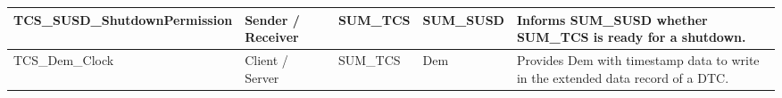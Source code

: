 \begin{longtable}{|l|l|l|l|l|}
\begin{minipage}{0.32\linewidth}\raggedright\vspace{.75ex}TCS\_SUSD\_ShutdownPermission\vspace{.75ex}\end{minipage} & \begin{minipage}{0.11\linewidth}\raggedright\vspace{.75ex}Sender / Receiver\vspace{.75ex}\end{minipage} & \begin{minipage}{0.11\linewidth}\raggedright\vspace{.75ex}SUM\_TCS\vspace{.75ex}\end{minipage} & \begin{minipage}{0.11\linewidth}\raggedright\vspace{.75ex}SUM\_SUSD\vspace{.75ex}\end{minipage} & \begin{minipage}{0.21\linewidth}\raggedright\vspace{.75ex}Informs SUM\_SUSD whether SUM\_TCS is ready for a shutdown.\vspace{.75ex}\end{minipage}\\\hline
\begin{minipage}{0.32\linewidth}\raggedright\vspace{.75ex}TCS\_Dem\_Clock\vspace{.75ex}\end{minipage} & \begin{minipage}{0.11\linewidth}\raggedright\vspace{.75ex}Client / Server\vspace{.75ex}\end{minipage} & \begin{minipage}{0.11\linewidth}\raggedright\vspace{.75ex}SUM\_TCS\vspace{.75ex}\end{minipage} & \begin{minipage}{0.11\linewidth}\raggedright\vspace{.75ex}Dem\vspace{.75ex}\end{minipage} & \begin{minipage}{0.21\linewidth}\raggedright\vspace{.75ex}Provides Dem with timestamp data to write in the extended data record of a DTC.\vspace{.75ex}\end{minipage}\\\hline

\end{longtable}
